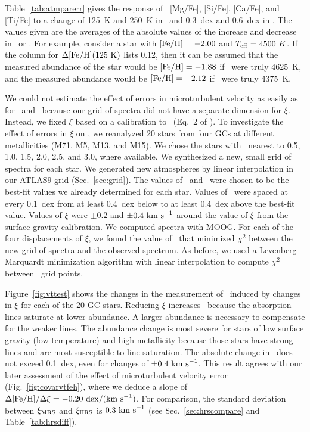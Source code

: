 \documentclass{emulateapj}
\begin{document}
Table~\ref{tab:atmparerr} gives the response of \feh\, [Mg/Fe],
[Si/Fe], [Ca/Fe], and [Ti/Fe] to a change of 125~K and 250~K in
\teff\ and 0.3~dex and 0.6~dex in \logg.  The values given are the
averages of the absolute values of the increase and decrease in
\teff\ or \logg.  For example, consider a star with ${\rm [Fe/H]} = -2.00$
and $T_{\rm eff} = 4500~K$.  If the column for $\Delta {\rm [Fe/H]}(125~{\rm
  K})$ lists 0.12, then it can be assumed that the measured abundance
of the star would be ${\rm [Fe/H]} = -1.88$ if \teff\ were truly 4625~K,
and the measured abundance would be ${\rm [Fe/H]} = -2.12$ if \teff\ were
truly 4375~K.

We could not estimate the effect of errors in microturbulent velocity
as easily as for \teff\ and \logg\ because our grid of spectra did not
have a separate dimension for $\xi$.  Instead, we fixed $\xi$ based on
a calibration to \logg\ (Eq.~2 of \citeauthor*{kir09}).  To
investigate the effect of errors in $\xi$ on \feh, we reanalyzed 20
stars from four GCs at different metallicities (M71, M5, M13, and
M15).  We chose the stars with \logg\ nearest to 0.5, 1.0, 1.5, 2.0,
2.5, and 3.0, where available.  We synthesized a new, small grid of
spectra for each star.  We generated new atmospheres by linear
interpolation in our ATLAS9 grid (Sec.~\ref{sec:grid}).  The values of
\teff\ and \logg\ were chosen to be the best-fit values we already
determined for each star.  Values of \feh\ were spaced at every
0.1~dex from at least 0.4~dex below to at least 0.4~dex above the
best-fit value.  Values of $\xi$ were $\pm 0.2$ and $\pm
0.4~\rm{km~s}^{-1}$ around the value of $\xi$ from the surface gravity
calibration.  We computed spectra with MOOG.  For each of the four
displacements of $\xi$, we found the value of \feh\ that minimized
$\chi^2$ between the new grid of spectra and the observed spectrum.
As before, we used a Levenberg-Marquardt minimization algorithm with
linear interpolation to compute $\chi^2$ between \feh\ grid points.

Figure~\ref{fig:vttest} shows the changes in the measurement of
\feh\ induced by changes in $\xi$ for each of the 20 GC stars.
Reducing $\xi$ increases \feh\ because the absorption lines saturate
at lower abundance.  A larger abundance is necessary to compensate for
the weaker lines.  The abundance change is most severe for stars of
low surface gravity (low temperature) and high metallicity because
those stars have strong lines and are most susceptible to line
saturation.  The absolute change in \feh\ does not exceed 0.1~dex,
even for changes of $\pm 0.4~\rm{km~s}^{-1}$.  This result agrees with
our later assessment of the effect of microturbulent velocity error
(Fig.~\ref{fig:covarvtfeh}), where we deduce a slope of
$\Delta{\rm [Fe/H]}/\Delta\xi = -0.20~\rm{dex}/(\rm{km~s}^{-1})$.
For comparison, the standard deviation between $\xi_{\rm MRS}$ and
$\xi_{\rm HRS}$ is $0.3~\rm{km~s}^{-1}$ (see
Sec.~\ref{sec:hrscompare} and Table~\ref{tab:hrsdiff}).
\end{document}
